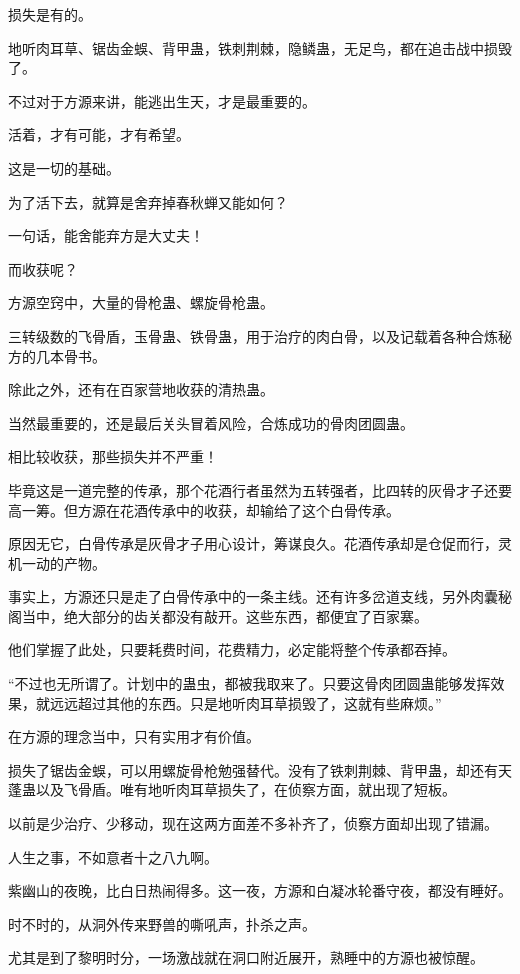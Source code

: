 \begin{this_body}
损失是有的。

地听肉耳草、锯齿金蜈、背甲蛊，铁刺荆棘，隐鳞蛊，无足鸟，都在追击战中损毁了。

不过对于方源来讲，能逃出生天，才是最重要的。

活着，才有可能，才有希望。

这是一切的基础。

为了活下去，就算是舍弃掉春秋蝉又能如何？

一句话，能舍能弃方是大丈夫！

而收获呢？

方源空窍中，大量的骨枪蛊、螺旋骨枪蛊。

三转级数的飞骨盾，玉骨蛊、铁骨蛊，用于治疗的肉白骨，以及记载着各种合炼秘方的几本骨书。

除此之外，还有在百家营地收获的清热蛊。

当然最重要的，还是最后关头冒着风险，合炼成功的骨肉团圆蛊。

相比较收获，那些损失并不严重！

毕竟这是一道完整的传承，那个花酒行者虽然为五转强者，比四转的灰骨才子还要高一筹。但方源在花酒传承中的收获，却输给了这个白骨传承。

原因无它，白骨传承是灰骨才子用心设计，筹谋良久。花酒传承却是仓促而行，灵机一动的产物。

事实上，方源还只是走了白骨传承中的一条主线。还有许多岔道支线，另外肉囊秘阁当中，绝大部分的齿关都没有敲开。这些东西，都便宜了百家寨。

他们掌握了此处，只要耗费时间，花费精力，必定能将整个传承都吞掉。

“不过也无所谓了。计划中的蛊虫，都被我取来了。只要这骨肉团圆蛊能够发挥效果，就远远超过其他的东西。只是地听肉耳草损毁了，这就有些麻烦。”

在方源的理念当中，只有实用才有价值。

损失了锯齿金蜈，可以用螺旋骨枪勉强替代。没有了铁刺荆棘、背甲蛊，却还有天蓬蛊以及飞骨盾。唯有地听肉耳草损失了，在侦察方面，就出现了短板。

以前是少治疗、少移动，现在这两方面差不多补齐了，侦察方面却出现了错漏。

人生之事，不如意者十之八九啊。

紫幽山的夜晚，比白日热闹得多。这一夜，方源和白凝冰轮番守夜，都没有睡好。

时不时的，从洞外传来野兽的嘶吼声，扑杀之声。

尤其是到了黎明时分，一场激战就在洞口附近展开，熟睡中的方源也被惊醒。


\end{this_body}
